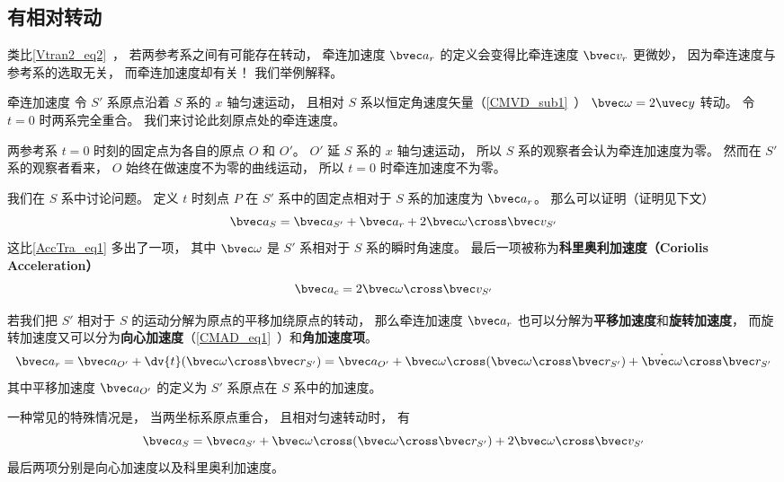 \subsection{有相对转动}
类比\autoref{Vtran2_eq2}~， 若两参考系之间有可能存在转动， 牵连加速度 $\bvec a_{r}$ 的定义会变得比牵连速度 $\bvec v_r$ 更微妙， 因为牵连速度与参考系的选取无关， 而牵连加速度却有关！ 我们举例解释。

\begin{example}{牵连加速度}
令 $S'$ 系原点沿着 $S$ 系的 $x$ 轴匀速运动， 且相对 $S$ 系以恒定角速度矢量（\autoref{CMVD_sub1}~） $\bvec \omega = 2\uvec y$ 转动。 令 $t = 0$ 时两系完全重合。 我们来讨论此刻原点处的牵连速度。

两参考系 $t = 0$ 时刻的固定点为各自的原点 $O$ 和 $O'$。 $O'$ 延 $S$ 系的 $x$ 轴匀速运动， 所以 $S$ 系的观察者会认为牵连加速度为零。 然而在 $S'$ 系的观察者看来， $O$ 始终在做速度不为零的曲线运动， 所以 $t = 0$ 时牵连加速度不为零。
\end{example}

我们在 $S$ 系中讨论问题。 定义 $t$ 时刻点 $P$ 在 $S'$ 系中的固定点相对于 $S$ 系的加速度为 $\bvec a_{r}$。 那么可以证明（证明见下文）
\begin{equation}\label{AccTra_eq2}
\bvec a_S = \bvec a_{S'} + \bvec a_{r} + 2 \bvec \omega \cross \bvec v_{S'}
\end{equation}
这比\autoref{AccTra_eq1} 多出了一项， 其中 $\bvec \omega$ 是 $S'$ 系相对于 $S$ 系的瞬时角速度。 最后一项被称为\textbf{科里奥利加速度（Coriolis Acceleration）}
\begin{equation}\label{AccTra_eq4}
\bvec a_c = 2 \bvec \omega \cross \bvec v_{S'}
\end{equation}

若我们把 $S'$ 相对于 $S$ 的运动分解为原点的平移加绕原点的转动， 那么牵连加速度 $\bvec a_r$ 也可以分解为\textbf{平移加速度}和\textbf{旋转加速度}， 而旋转加速度又可以分为\textbf{向心加速度}（\autoref{CMAD_eq1}~）和\textbf{角加速度项}。
\begin{equation}\label{AccTra_eq5}
\bvec a_{r} = \bvec a_{O'} + \dv{t}(\bvec\omega\cross\bvec r_{S'})
= \bvec a_{O'} + \bvec\omega\cross(\bvec\omega\cross\bvec r_{S'}) + \dot{\bvec\omega} \cross\bvec r_{S'}
\end{equation}
其中平移加速度 $\bvec a_{O'}$ 的定义为 $S'$ 系原点在 $S$ 系中的加速度。

一种常见的特殊情况是， 当两坐标系原点重合， 且相对匀速转动时， 有
\begin{equation}
\bvec a_S = \bvec a_{S'} + \bvec\omega\cross(\bvec\omega\cross\bvec r_{S'}) + 2 \bvec \omega \cross \bvec v_{S'}
\end{equation}
最后两项分别是向心加速度以及科里奥利加速度。

